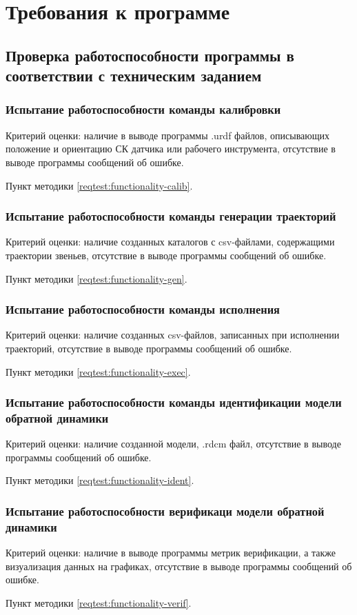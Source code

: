 \newpage
\section{Требования к программе}

\subsection{Проверка работоспособности программы \productnamesecond в соответствии с техническим заданием} \label{req:check-prog}

\subsubsection{Испытание работоспособности команды калибровки} \label{req:functionality-calib}
Критерий оценки: наличие в выводе программы .urdf файлов, описывающих положение и ориентацию СК датчика или рабочего инструмента, отсутствие в выводе программы сообщений об ошибке.

Пункт методики \ref{reqtest:functionality-calib}.

\subsubsection{Испытание работоспособности команды генерации траекторий} \label{req:functionality-gen}
Критерий оценки: наличие созданных каталогов с csv-файлами, содержащими траектории звеньев, отсутствие в выводе программы сообщений об ошибке.

Пункт методики \ref{reqtest:functionality-gen}.

\subsubsection{Испытание работоспособности команды исполнения} \label{req:functionality-exec}
Критерий оценки: наличие созданных csv-файлов, записанных при исполнении траекторий, отсутствие в выводе программы сообщений об ошибке.

Пункт методики \ref{reqtest:functionality-exec}.

\subsubsection{Испытание работоспособности команды идентификации модели обратной динамики} \label{req:functionality-ident}
Критерий оценки: наличие созданной модели, .rdcm файл, отсутствие в выводе программы сообщений об ошибке.

Пункт методики \ref{reqtest:functionality-ident}.

\subsubsection{Испытание работоспособности верификаци модели обратной динамики} \label{req:functionality-verif}
Критерий оценки: наличие в выводе программы метрик верификации, а также визуализация данных на графиках, отсутствие в выводе программы сообщений об ошибке.

Пункт методики \ref{reqtest:functionality-verif}.
